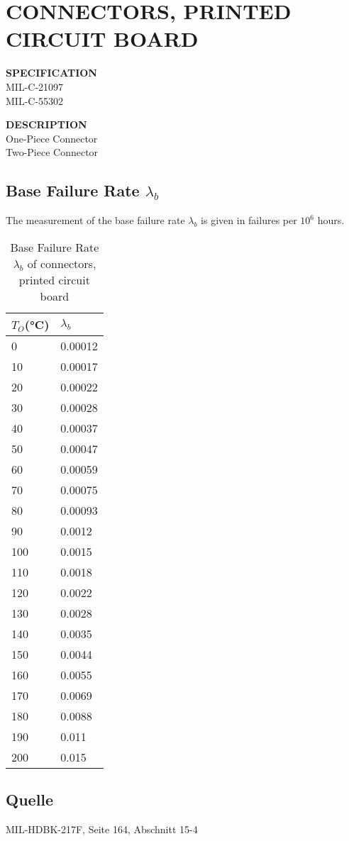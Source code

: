 \section{CONNECTORS, PRINTED CIRCUIT BOARD}

\begin{minipage}[t]{0.29\textwidth}
    \textbf{SPECIFICATION}\\
    MIL-C-21097\\MIL-C-55302
\end{minipage}
\begin{minipage}[t]{0.7\textwidth}
    \textbf{DESCRIPTION}\\
    One-Piece Connector\\Two-Piece Connector
\end{minipage}

\subsection{Base Failure Rate $\lambda_b$}
The measurement of the base failure rate $\lambda_b$ is given in failures per $10^6$ hours.
\begin{table}[ht]
{\centering

\begin{tabular}{|p{3cm}|p{3cm}|}
    \hline
    \textbf{$T_O$(°C)} & \textbf{$\lambda_b$} \\
    \hline
    0 & 0.00012 \\
    \hline
    10 & 0.00017 \\
    \hline
    20 & 0.00022 \\
    \hline
    30 & 0.00028 \\
    \hline
    40 & 0.00037 \\
    \hline
    50 & 0.00047 \\
    \hline
    60 & 0.00059 \\
    \hline
    70 & 0.00075 \\
    \hline
    80 & 0.00093 \\
    \hline
    90 & 0.0012 \\
    \hline
    100 & 0.0015 \\
    \hline
    110 & 0.0018 \\
    \hline
    120 & 0.0022 \\
    \hline
    130 & 0.0028 \\
    \hline
    140 & 0.0035 \\
    \hline
    150 & 0.0044 \\
    \hline
    160 & 0.0055 \\
    \hline
    170 & 0.0069 \\
    \hline
    180 & 0.0088 \\
    \hline
    190 & 0.011 \\
    \hline
    200 & 0.015 \\
    \hline
\end{tabular}

\caption{Base Failure Rate $\lambda_b$ of connectors, printed circuit board}

\label{tab:bfr_connectors_printed_circuit_board}
\par}
\end{table}
\subsection*{Quelle}
MIL-HDBK-217F, Seite 164, Abschnitt 15-4
